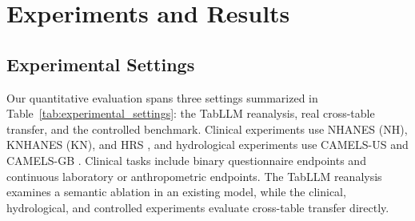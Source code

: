 \documentclass{article} %
\begin{document}
\section{Experiments and Results}
\label{sec:experiments}

\subsection{Experimental Settings}
\label{sec:exp_setup}

Our quantitative evaluation spans three settings summarized in Table~\ref{tab:experimental_settings}: the TabLLM reanalysis, real cross-table transfer, and the controlled benchmark.
Clinical experiments use NHANES (NH), KNHANES (KN), and HRS \citep{johnson2013nhanes,kweon2014knhanes,sonnega2014hrs}, and hydrological experiments use CAMELS-US and CAMELS-GB \citep{addor2017camels,coxon2020camelsgb}.
Clinical tasks include binary questionnaire endpoints and continuous laboratory or anthropometric endpoints.
The TabLLM reanalysis examines a semantic ablation in an existing model, while the clinical, hydrological, and controlled experiments evaluate cross-table transfer directly.
\end{document}
